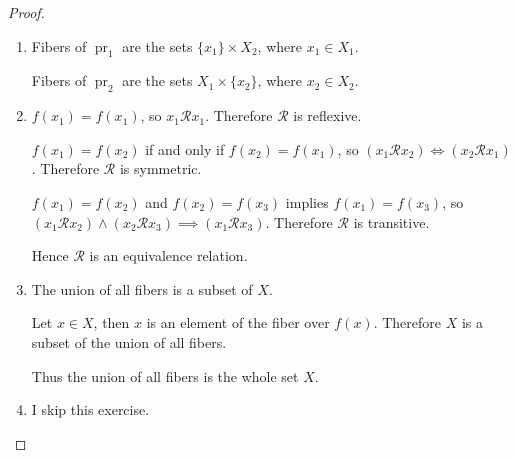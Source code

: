 \begin{proof}
    \begin{enumerate}[label={(\alph*)}]
        \item Fibers of $\operatorname{pr}_{1}$ are the sets $\{ x_{1} \}\times X_{2}$, where $x_{1}\in X_{1}$.

              Fibers of $\operatorname{pr}_{2}$ are the sets $X_{1}\times\{ x_{2} \}$, where $x_{2}\in X_{2}$.
        \item $f(x_{1}) = f(x_{1})$, so $x_{1}\mathcal{R}x_{1}$. Therefore $\mathcal{R}$ is reflexive.

              $f(x_{1}) = f(x_{2})$ if and only if $f(x_{2}) = f(x_{1})$, so $(x_{1}\mathcal{R}x_{2})\Leftrightarrow (x_{2}\mathcal{R}x_{1})$. Therefore $\mathcal{R}$ is symmetric.

              $f(x_{1}) = f(x_{2})$ and $f(x_{2}) = f(x_{3})$ implies $f(x_{1}) = f(x_{3})$, so $(x_{1}\mathcal{R}x_{2})\land (x_{2}\mathcal{R}x_{3})\implies (x_{1}\mathcal{R}x_{3})$. Therefore $\mathcal{R}$ is transitive.

              Hence $\mathcal{R}$ is an equivalence relation.
        \item The union of all fibers is a subset of $X$.

              Let $x\in X$, then $x$ is an element of the fiber over $f(x)$. Therefore $X$ is a subset of the union of all fibers.

              Thus the union of all fibers is the whole set $X$.
        \item I skip this exercise.
    \end{enumerate}
\end{proof}
\newpage

